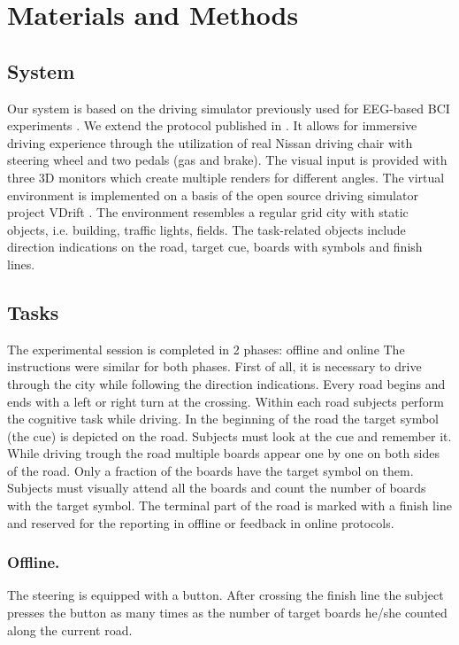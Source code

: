 \documentclass[12pt]{iopart}
\begin{document}
\section{Materials and Methods}
\label{sec:methods}

\subsection{System}
Our system is based on the driving simulator previously used for
EEG-based BCI experiments \cite{khaliliardali_action_2015,zhang_eeg-based_2015}.
We extend the protocol published in \cite{renold_eeg_2014}.
It allows for immersive driving experience through the utilization
of real Nissan driving chair with steering wheel and two pedals (gas and brake).
The visual input is provided with three 3D monitors which create multiple renders for
different angles. The virtual environment is implemented on a basis of
the open source driving simulator project VDrift \cite{noauthor_about_nodate}.
The environment resembles a regular grid city with static objects, i.e.
building, traffic lights, fields. The task-related objects include
direction indications on the road, target cue, boards with symbols
and finish lines. 

\subsection{Tasks}
The experimental session is completed in 2 phases: offline and online
The instructions were similar for both phases.
First of all, it is necessary to drive through the city while
following the direction indications.
Every road begins and ends with a left or right turn at the crossing.
Within each road subjects perform the cognitive task while driving.
In the beginning of the road the target symbol (the cue) is depicted
on the road. Subjects must look at the cue and remember it.
While driving trough the road multiple boards appear one by one
on both sides of the road. Only a fraction of the boards have
the target symbol on them. Subjects must visually attend all the boards
and count the number of boards with the target symbol. 
The terminal part of the road is marked with a finish line and 
reserved for the reporting in offline or feedback in online protocols.

\subsubsection*{Offline.}
The steering is equipped with a button.
After crossing the finish line the subject presses the button as many times
as the number of target boards he/she counted along the current road.
\end{document}
